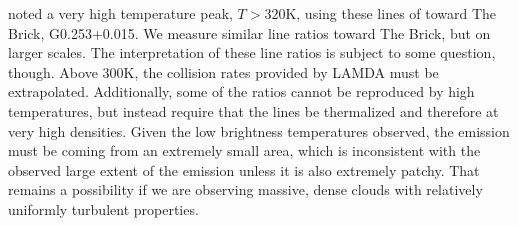 \citet{Johnston2014a} noted a very high temperature peak, $T>320$K, using these
lines of \formaldehyde toward The Brick, G0.253+0.015.  We measure similar line
ratios toward The Brick, but on larger scales.  The interpretation of these
line ratios is subject to some question, though.  Above 300K, the collision
rates provided by LAMDA \citep{Schoier2005a,Wiesenfeld2013a} must be
extrapolated.  Additionally, some of the ratios cannot be reproduced by high
temperatures, but instead require that the lines be thermalized and therefore
at very high densities.   Given the low brightness temperatures observed,
the emission must be coming from an extremely small area, which is inconsistent
with the observed large extent of the emission unless it is also extremely
patchy.  That remains a possibility if we are observing massive, dense clouds
with relatively uniformly turbulent properties.

